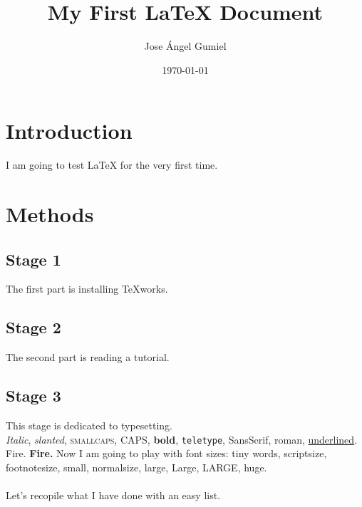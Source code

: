\documentclass[a4paper,12pt]{article}
\begin{document}
	\title{My First {\LaTeX} Document}
	\author{Jose Ángel Gumiel}
	\date{\today}
	\maketitle
	
	
	\tableofcontents
	\newpage
	
	\section{Introduction}
	I am going to test {\LaTeX} for the very first time.
	
	\section{Methods}
		\subsection{Stage 1}
		\label{sec1}
		The first part is installing TeXworks.
		
		\subsection{Stage 2}
		The second part is reading a tutorial.
		
		\subsection{Stage 3}
		This stage is dedicated to typesetting.\\
		\textit{Italic}, \textsl{slanted}, \textsc{ smallcaps}, CAPS, \textbf{bold}, \texttt{teletype}, \textsf{SansSerif}, \textrm{roman}, \underline{underlined}.\newline
		{\color{red}Fire.}\break
		\textbf{{\color{red}Fire.}} \break
		Now I am going to play with font sizes:
		{\tiny tiny words}, {\scriptsize scriptsize}, {\footnotesize footnotesize}, {\small small}, {\normalsize normalsize}, {\large large}, {\Large Large}, {\LARGE LARGE}, {\huge huge}.\\
		\\
		Let's recopile what I have done with an easy list.
		
\end{document}
